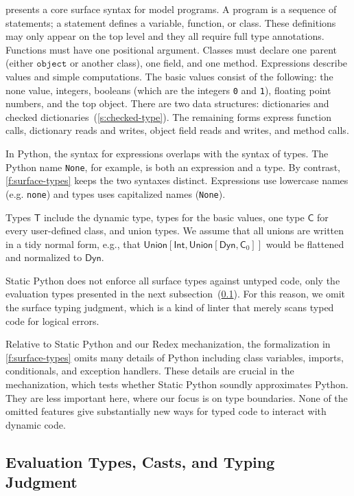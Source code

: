 \documentclass[english,cleveref,submission]{programming}
\newcommand{\SP}{Static Python}
\newcommand{\code}[1]{\texttt{#1}}
\newcommand{\typefont}[1]{\mathsf{#1}}
\newcommand{\paramtype}[2]{#1[#2]}
\newcommand{\sptype}{\typefont{T}}
\newcommand{\sptclass}{\typefont{C}}
\newcommand{\sptint}{\typefont{Int}}
\newcommand{\sptdyn}{\typefont{Dyn}}
\newcommand{\sptunion}[1]{\paramtype{\typefont{Union}}{#1}}
\newcommand{\spobject}{\code{object}}
\begin{document}
 presents a core surface syntax for model programs.
A program is a sequence of statements;
a statement defines a variable, function, or class.
These definitions may only appear on the top level
and they all require full type annotations.
Functions must have one positional argument.
Classes must declare one parent (either $\spobject$ or another class), one field, and one method.
Expressions describe values and simple computations.
The basic values consist of the following: the none value, integers,
booleans (which are the integers \code{0} and \code{1}), floating point numbers, and the top object.
There are two data structures: dictionaries and checked dictionaries~(\cref{s:checked-type}).
The remaining forms express function calls, dictionary reads and writes, object field reads and writes,
and method calls.

In Python, the syntax for expressions overlaps with the syntax of types.
The Python name \code{None}, for example, is both an expression and a type.
By contrast, \cref{f:surface-types} keeps the two syntaxes distinct.
Expressions use lowercase names (e.g. \code{none}) and types uses capitalized
names (\code{None}).

Types $\sptype$ include the dynamic type, types for the basic values, one type $\sptclass$ for every
user-defined class, and union types.
We assume that all unions are written in a tidy normal form, e.g., that
$\sptunion{\sptint, \sptunion{\sptdyn, \sptclass_0}}$ would be flattened and normalized to $\sptdyn$.

\SP{} does not enforce all surface types against untyped code, only the evaluation
types presented in the next subsection~(\cref{s:eval-types}).
For this reason, we omit the surface typing judgment, which is a kind of linter
that merely scans typed code for logical errors.

Relative to \SP{} and our Redex mechanization, the formalization in \cref{f:surface-types} omits
many details of Python including class variables, imports, conditionals, and exception handlers.
These details are crucial in the mechanization, which tests whether \SP{}
soundly approximates Python.
They are less important here, where our focus is on type boundaries.
None of the omitted features give substantially new ways for typed code to interact with dynamic code.


\subsection{Evaluation Types, Casts, and Typing Judgment}
\label{s:eval-types}
\end{document}
